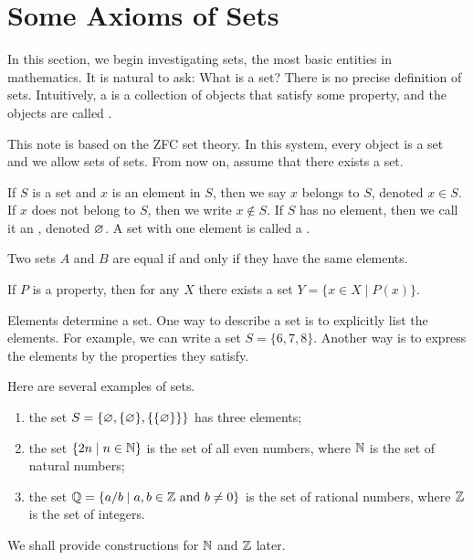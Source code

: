 \documentclass[10pt]{article}
\begin{document}
\section{Some Axioms of Sets}
\par
In this section, we begin investigating sets, the most basic entities in mathematics. It is natural to ask: What is a set? There is no precise definition of sets. Intuitively, a  is a collection of objects that satisfy some property, and the objects are called .
\begin{remark}
    This note is based on the ZFC set theory. In this system, every object is a set and we allow sets of sets. From now on, assume that there exists a set.
\end{remark}
\par
If $S$ is a set and $x$ is an element in $S$, then we say $x$ belongs to $S$, denoted $x\in S$. If $x$ does not belong to $S$, then we write $x\notin S$. If $S$ has no element, then we call it an , denoted $\varnothing$. A set with one element is called a .
\begin{Axiom of extensionality}
    Two sets $A$ and $B$ are equal if and only if they have the same elements.
\end{Axiom of extensionality}
\begin{Axiom schema of separation}
    If $P$ is a property, then for any $X$ there exists a set $Y=\{x\in X\mid P(x)\}$.
\end{Axiom schema of separation}
\par
Elements determine a set. One way to describe a set is to explicitly list the elements. For example, we can write a set $S=\{6,7,8\}$. Another way is to express the elements by the properties they satisfy.
\begin{example}
    Here are several examples of sets.
    \begin{enumerate}
        \item the set $S=\{\varnothing,\{\varnothing\},\{\{\varnothing\}\}\}$ has three elements;
        \item the set $\{2n\mid n\in\mathbb{N}\}$ is the set of all even numbers, where $\mathbb{N}$ is the set of natural numbers;
        \item the set $\Q=\{a/b\mid a,b\in\Z\ \text{and}\ b\ne 0\}$ is the set of rational numbers, where $\mathbb{Z}$ is the set of integers.
    \end{enumerate}
    We shall provide constructions for $\mathbb{N}$ and $\mathbb{Z}$ later.
\end{example}
\end{document}
